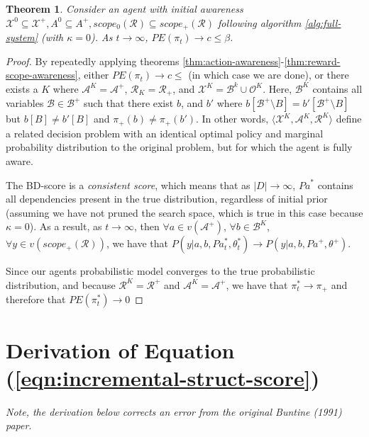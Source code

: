 \documentclass{article}
\newcommand{\Pa}{\mathit{Pa}}
\newtheorem{theorem}{Theorem}
\begin{document}
	\begin{theorem}
		Consider an agent with initial awareness $\mathcal{X}^0 \subseteq \mathcal{X}^+, A^0 \subseteq A^+ ,scope_0(\mathcal{R}) \subseteq scope_+(\mathcal{R})$ following algorithm \ref{alg:full-system} (with $\kappa = 0$). As $t \rightarrow \infty$, $PE(\pi_{t}) \rightarrow c \leq \beta$.
	\end{theorem}
	\begin{proof}
		By repeatedly applying theorems \ref{thm:action-awareness}-\ref{thm:reward-scope-awareness}, either $PE(\pi_t) \rightarrow c \leq$ (in which case we are done), or there exists a $K$ where $\mathcal{A}^K = \mathcal{A}^+$, $\mathcal{R}_K = \mathcal{R}_+$, and $\mathcal{X}^K = \mathcal{B}^k \cup \mathcal{O}^K$. Here, $\mathcal{B}^K$ contains all variables $\mathcal{B} \in \mathcal{B}^+$ such that there exist $b$, and $b'$ where $b[\mathcal{B}^+ \setminus B] = b'[\mathcal{B}^+ \setminus B]$ but $b[B] \neq b'[B]$ and $\pi_+(b) \neq \pi_+(b')$. In other words, $\langle \mathcal{X}^K, \mathcal{A}^K, \mathcal{R}^K \rangle$ define a related decision problem with an identical optimal policy and marginal probability distribution to the original problem, but for which the agent is fully aware.
		
		The BD-score is a \emph{consistent score}, which means that as $|D| \rightarrow \infty$, $\Pa^*$ contains all dependencies present in the true distribution, regardless of initial prior (assuming we have not pruned the search space, which is true in this case because $\kappa = 0$). As a result, as $t \rightarrow \infty$, then $\forall a \in v(\mathcal{A}^+)$, $\forall b \in \mathcal{B}^K$, $\forall y \in v(scope_+(\mathcal{R}))$, we have that $P(y | a, b, \Pa^*_t, \theta^*_t) \rightarrow P(y | a, b, \Pa^+, \theta^+)$.
		
		Since our agents probabilistic model converges to the true probabilistic distribution, and because $\mathcal{R}^K = \mathcal{R}^+$ and $\mathcal{A}^K = \mathcal{A}^+$, we have that $\pi^*_t \rightarrow \pi_+$ and therefore that $PE(\pi^*_t) \rightarrow 0$ 
	\end{proof}
	
	\section{Derivation of Equation (\ref{eqn:incremental-struct-score})}
	
	\textit{Note, the derivation below corrects an error from the original Buntine (1991) paper}.
	
\end{document}
